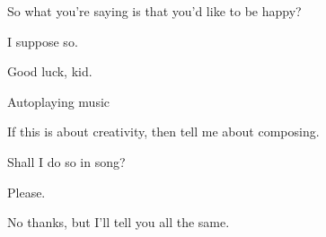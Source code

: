 \begin{ally}
So what you're saying is that you'd like to be happy?
\end{ally}
I suppose so.

\begin{ally}
Good luck, kid.
\end{ally}\newpage

Autoplaying music

\begin{ally}
If this is about creativity, then tell me about composing.
\end{ally}
Shall I do so in song?

\begin{ally}
Please.
\end{ally}
No thanks, but I'll tell you all the same.
\newpage
